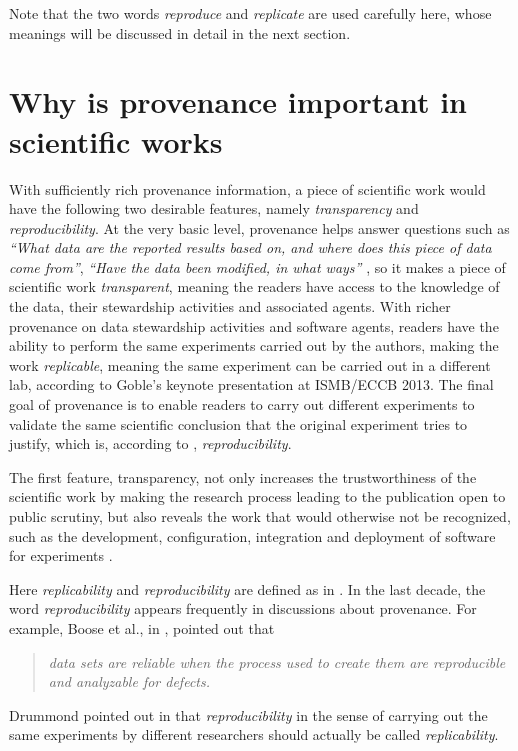 Note that the two words \emph{reproduce} and \emph{replicate} are used carefully here, whose meanings 
will be discussed in detail in the next section.


\section{Why is provenance important in scientific works}
With sufficiently rich provenance information, a piece of scientific work would have the following two 
desirable features, namely \emph{transparency} and \emph{reproducibility}. At the very basic level, 
provenance helps answer questions such as \emph{``What data are the reported results based on, and 
where does this piece of data come from''}, \emph{``Have the data been modified, in what ways''} 
\cite{davidson2008provenance}, so it makes a piece of scientific work \emph{transparent}, meaning the 
readers have access to the knowledge of the data, their stewardship activities and associated agents. 
With richer provenance on data stewardship activities and software agents, readers have the ability to 
perform the same experiments carried out by the authors, making the work \emph{replicable}, meaning 
the same experiment can be carried out in a different lab, according to Goble's keynote presentation 
at ISMB/ECCB 2013. The final goal of provenance is to enable readers to carry out different 
experiments to validate the same scientific conclusion that the original experiment tries to justify, 
which is, according to \cite{drummond2009replicability}, \emph{reproducibility}.

The first feature, transparency, not only increases the trustworthiness of the scientific work by 
making the research process leading to the publication open to public scrutiny, but also reveals the 
work that would otherwise not be recognized, such as the development, configuration, integration and 
deployment of software for experiments \cite{goble2014better}.

Here \emph{replicability} and \emph{reproducibility} are defined as in 
\cite{drummond2009replicability}. In the last decade, the word \emph{reproducibility} appears frequently 
in discussions about provenance. For example, 
Boose et al., in \cite{boose2007ensuring}, pointed out that
\begin{quote}\emph{data sets are reliable when the process used to create them are reproducible and 
analyzable for defects.}\end{quote}
Drummond pointed out in \cite{drummond2009replicability} that \emph{reproducibility} in the sense of 
carrying out the same experiments by different researchers should actually be called 
\emph{replicability}.

